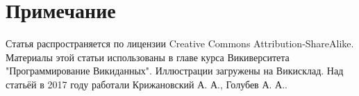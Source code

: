 \section{Примечание}

Статья распространяется по лицензии Creative Commons Attribution-ShareAlike. Материалы этой статьи использованы в главе курса Викиверситета "Программирование Викиданных"\cite{WDBattle}. Иллюстрации загружены на Викисклад. Над статьёй в 2017 году работали Крижановский А. А., Голубев А. А..